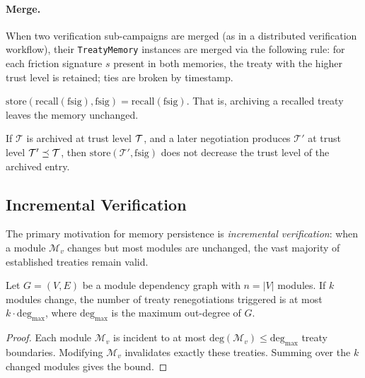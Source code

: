 \documentclass[11pt]{article}
\newcommand{\Trt}{\mathcal{T}}             %
\newcommand{\Mod}{\mathcal{M}}            %
\newcommand{\Recall}{\mathrm{recall}}     %
\newcommand{\Store}{\mathrm{store}}       %
\begin{document}
\paragraph{Merge.}  When two verification sub-campaigns are merged
(as in a distributed verification workflow), their \texttt{TreatyMemory}
instances are merged via the following rule: for each friction
signature $s$ present in both memories, the treaty with the higher
trust level is retained; ties are broken by timestamp.

\begin{proposition}\label{prop:mem-idem}
$\Store(\Recall(\mathrm{fsig}), \mathrm{fsig}) = \Recall(\mathrm{fsig})$.
That is, archiving a recalled treaty leaves the memory unchanged.
\end{proposition}

\begin{proposition}\label{prop:mem-mono}
If $\Trt$ is archived at trust level $\mathcal{T}$, and a later negotiation
produces $\Trt'$ at trust level $\mathcal{T}' \preceq \mathcal{T}$, then
$\Store(\Trt', \mathrm{fsig})$ does not decrease the trust level of
the archived entry.
\end{proposition}

\subsection{Incremental Verification}

The primary motivation for memory persistence is \emph{incremental
verification}: when a module $\Mod_v$ changes but most modules are
unchanged, the vast majority of established treaties remain valid.

\begin{theorem}\label{thm:incr}
Let $G = (V, E)$ be a module dependency graph with $n = |V|$
modules.  If $k$ modules change, the number of treaty
renegotiations triggered is at most $k \cdot \mathrm{deg}_{\max}$,
where $\mathrm{deg}_{\max}$ is the maximum out-degree of $G$.
\end{theorem}

\begin{proof}
Each module $\Mod_v$ is incident to at most $\mathrm{deg}(\Mod_v) \leq
\mathrm{deg}_{\max}$ treaty boundaries.  Modifying $\Mod_v$
invalidates exactly these treaties.  Summing over the $k$ changed
modules gives the bound.
\end{proof}

\end{document}
